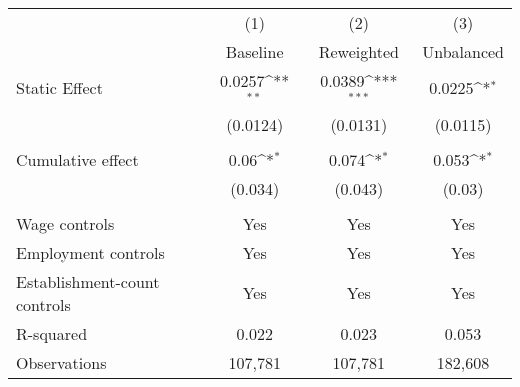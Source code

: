 {
\def\sym#1{\ifmmode^{#1}\else\(^{#1}\)\fi}
\begin{tabular}{l*{3}{c}}
\hline\hline
          &\multicolumn{1}{c}{(1)}&\multicolumn{1}{c}{(2)}&\multicolumn{1}{c}{(3)}\\
          &\multicolumn{1}{c}{Baseline}&\multicolumn{1}{c}{Reweighted}&\multicolumn{1}{c}{Unbalanced}\\
\hline
Static Effect&   0.0257\sym{**} &   0.0389\sym{***}&   0.0225\sym{*}  \\
          & (0.0124)         & (0.0131)         & (0.0115)         \\
\hline
\vspace{-1mm}&                  &                  &                  \\
Cumulative effect&0.06\sym{*}         &0.074\sym{*}         &0.053\sym{*}         \\
          &  (0.034)         &  (0.043)         &   (0.03)         \\
\hline    &                  &                  &                  \\
Wage controls&      Yes         &      Yes         &      Yes         \\
Employment controls&      Yes         &      Yes         &      Yes         \\
Establishment-count controls&      Yes         &      Yes         &      Yes         \\
R-squared &    0.022         &    0.023         &    0.053         \\
Observations&  107,781         &  107,781         &  182,608         \\
\hline\hline
\end{tabular}
}

